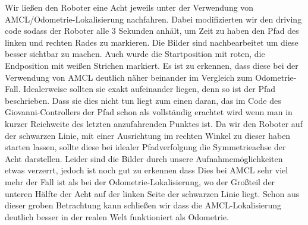 \documentclass[11pt,a4paper]{article}
\begin{document}
Wir ließen den Roboter eine Acht jeweils unter der Verwendung von AMCL/Odometrie-Lokalisierung nachfahren. Dabei modifizierten wir den driving code sodass der Roboter alle 3 Sekunden anhält,
um Zeit zu haben den Pfad des linken und rechten Rades zu markieren. Die Bilder sind nachbearbeitet um diese besser sichtbar zu machen. Auch wurde die Startposition mit roten, die Endposition mit 
weißen Strichen markiert. Es ist zu erkennen, dass diese bei der Verwendung von AMCL deutlich näher beinander im  Vergleich zum Odometrie-Fall. Idealerweise sollten sie exakt aufeinander liegen, denn so ist 
der Pfad beschrieben. Dass sie dies nicht tun liegt zum einen daran, das im Code des Giovanni-Controllers der Pfad schon als vollständig erachtet wird wenn man in kurzer Reichweite des letzten anzufahrenden Punktes ist.
Da wir den Roboter auf der schwarzen Linie, mit einer Ausrichtung im rechten Winkel zu dieser haben starten lassen, sollte diese bei idealer Pfadverfolgung die Symmetrieachse der Acht darstellen. Leider sind die Bilder durch
unsere Aufnahmemöglichkeiten etwas verzerrt, jedoch ist noch gut zu erkennen dass Dies bei AMCL sehr viel mehr der Fall ist als bei der Odometrie-Lokalisierung, wo der Großteil der unteren Hälfte der Acht auf der linken Seite 
der schwarzen Linie liegt. Schon aus dieser groben Betrachtung kann schließen wir dass die AMCL-Lokalisierung deutlich besser in der realen Welt funktioniert als Odometrie.
\end{document}
